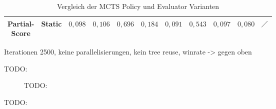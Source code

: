 \begin{table}[H]
{\begin{tabular}{|c|c|c|c|c|c|c|c|c|c|c|}
            \tiny \makecell{Partial-                                                                                                                                                                                                                                                                                                                                                              \\Score} &        Static & \cellcolor[HTML]{f9826f}$0{,}098$ & \cellcolor[HTML]{f98470}$0{,}106$ & \cellcolor[HTML]{c2da81}$0{,}696$ & \cellcolor[HTML]{fa9874}$0{,}184$ & \cellcolor[HTML]{f9806f}$0{,}091$ & \cellcolor[HTML]{f2e884}$0{,}543$ & \cellcolor[HTML]{f9826f}$0{,}097$ & \cellcolor[HTML]{f97d6e}$0{,}080$ & $\diagup$                         \\ \hline
        \end{tabular}}
    \vspace{3pt}
    \caption{Vergleich der \acs{MCTS} Policy und Evaluator Varianten}
    \label{tabelle:mcts-policy-eval-comparision}
\end{table}

Iterationen 2500, keine parallelisierungen, kein tree reuse, winrate -> gegen oben

TODO:

\begin{figure}[!ht]
    \centering
    \caption{TODO:}
    \label{fig:mcts-tree-reuse-comparision}
\end{figure}

TODO:


